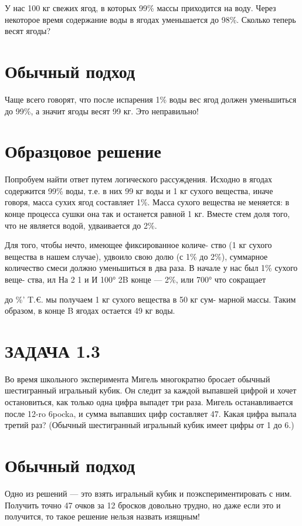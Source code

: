 У нас 100 кг свежих ягод, в которых 99\% массы приходится на воду. Через некоторое время содержание воды в ягодах уменьшается до 98\%. Сколько теперь весят ягоды?

\section{Обычный подход}

Чаще всего говорят, что после испарения 1\% воды вес ягод должен уменьшиться до 99\%, а значит ягоды весят 99 кг. Это неправильно!

\section{Образцовое решение}

Попробуем найти ответ путем логического рассуждения. Исходно в ягодах содержится 99\% воды, т.е. в них 99 кг воды и 1 кг сухого вещества, иначе говоря, масса сухих ягод составляет 1\%. Масса сухого вещества не меняется: в конце процесса сушки она так и останется равной 1 кг. Вместе стем доля того, что не является водой, удваивается до 2\%.

Для того, чтобы нечто, имеющее фиксированное количе- ство (1 кг сухого вещества в нашем случае), удвоило свою долю (с 1\% до 2\%), суммарное количество смеси должно уменьшиться в два раза. В начале у нас был 1\% сухого веще- ства, ил На 2 1 и И 100° 2B конце — 2\%, или 700° что сокращает

до \%’ T.€. мы получаем 1 кг сухого вещества в 50 кг сум- марной массы. Таким образом, в конце B ягодах остается 49 кг воды.

\section{ЗАДАЧА 1.3}

Во время школьного эксперимента Мигель многократно бросает обычный шестигранный игральный кубик. Он следит за каждой выпавшей цифрой и хочет остановиться, как только одна цифра выпадет три раза. Мигель останавливается после 12-ro 6pocka, и сумма выпавших цифр составляет 47. Какая цифра выпала третий раз? (Обычный шестигранный игральный кубик имеет цифры от 1 до 6.)

\section{Обычный подход}

Одно из решений — это взять игральный кубик и поэкспериментировать с ним. Получить точно 47 очков за 12 бросков довольно трудно, но даже если это и получится, то такое решение нельзя назвать изящным!

